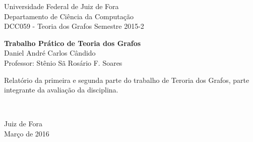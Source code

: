 \vspace*{-2cm}
{\bf
\begin{center}
  {\large
  \hspace*{0cm}Universidade Federal de Juiz de Fora} \\
  \hspace*{0cm}Departamento de Ciência da Computação \\
  \hspace*{0cm}DCC059 - Teoria dos Grafos Semestre 2015-2  \\
\end{center}}
\vspace{4.0cm}
\noindent
\begin{center}
  {\Large \bf Trabalho Prático de Teoria dos Grafos } \\[4cm]
  {\Large Daniel André Carlos Cândido}\\[6mm]
  {\Large Professor: Stênio Sã Rosário F. Soares}\\[3.0cm]
\end{center}

{\raggedleft
\begin{minipage}[t]{8.3cm}
  \setlength{\baselineskip}{0.25in}
  Relatório da primeira e segunda parte do  trabalho de Teroria dos Grafos, parte integrante da avaliação da disciplina.
\end{minipage}\\[1cm]}

\vspace{4cm}
{\center Juiz de Fora \\[1mm]
Março de 2016 \\}

\newpage
